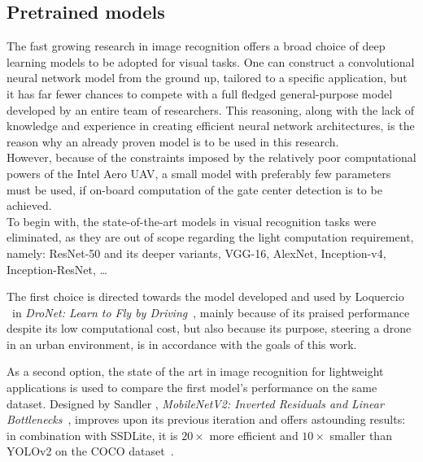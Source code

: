 \subsection{Pretrained models}

The fast growing research in image recognition offers a broad choice of deep
learning models to be adopted for visual tasks. One can construct a
convolutional neural network model from the ground up, tailored to a specific
application, but it has far fewer chances to compete with a full fledged
general-purpose model developed by an entire team of researchers. This
reasoning, along with the lack of knowledge and experience in creating
efficient neural network architectures, is the reason why an already proven
model is to be used in this research.\\

However, because of the constraints imposed by the relatively poor
computational powers of the Intel Aero UAV, a small model with preferably few
parameters must be used, if on-board computation of the gate center detection is
to be achieved.\\

To begin with, the state-of-the-art models in visual recognition tasks were
eliminated, as they are out of scope regarding the light computation 
requirement, namely: ResNet-50 and its deeper variants, VGG-16, AlexNet,
Inception-v4, Inception-ResNet, \etc \ldots

The first choice is directed towards the model developed and used by Loquercio
\etal~in \emph{DroNet: Learn to Fly by Driving}~\cite{dronet}, mainly because
of its praised performance despite its low computational cost, but also because
its purpose, steering a drone in an urban environment, is in accordance with
the goals of this work.

As a second option, the state of the art in image recognition for lightweight
applications is used to compare the first model's performance on the same
dataset. Designed by Sandler \etal, \emph{MobileNetV2: Inverted Residuals and
Linear Bottlenecks}~\cite{MobileNetV2}, improves upon its previous iteration
and offers astounding results: in combination with SSDLite, it is $20\times$ more
efficient and $10\times$ smaller than YOLOv2 on the COCO dataset~\cite{MobileNetV2}.
